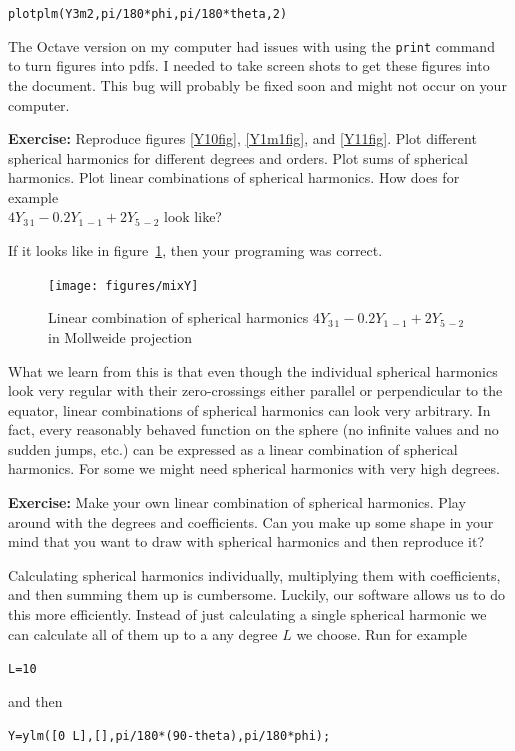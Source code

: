 \documentclass[11pt]{article}
\newcommand{\Yfun}{Y}
\begin{document}
\qquad \verb+plotplm(Y3m2,pi/180*phi,pi/180*theta,2)+

The Octave version on my computer had issues with using the
\verb+print+ command to turn figures into pdfs. I needed to take
screen shots to get these figures into the document. This bug will
probably be fixed soon and might not occur on your computer.

\textbf{Exercise:} Reproduce figures \ref{Y10fig}, \ref{Y1m1fig}, and \ref{Y11fig}. Plot different spherical harmonics for different degrees and orders. Plot sums of spherical harmonics. Plot linear combinations of spherical harmonics. How does for example \\{$4\Yfun_{3\,1} - 0.2\Yfun_{1\,-1} +2\Yfun_{5\,-2}$} look like?

If it looks like in figure~\ref{MixY}, then your programing was
correct.

\begin{figure}%
  \centering
  \texttt{[image: figures/mixY]}
  \caption{Linear combination of spherical harmonics $4\Yfun_{3\,1} - 0.2\Yfun_{1\,-1} +2\Yfun_{5\,-2}$ in Mollweide projection}
  \label{MixY}
\end{figure}

What we learn from this is that even though the individual spherical
harmonics look very regular with their zero-crossings either parallel
or perpendicular to the equator, linear combinations of spherical
harmonics can look very arbitrary. In fact, every reasonably behaved
function on the sphere (no infinite values and no sudden jumps, etc.)
can be expressed as a linear combination of spherical harmonics. For
some we might need spherical harmonics with very high degrees.

\textbf{Exercise:} Make your own linear combination of spherical
harmonics. Play around with the degrees and coefficients. Can you make
up some shape in your mind that you want to draw with spherical
harmonics and then reproduce it?

Calculating spherical harmonics individually, multiplying them with
coefficients, and then summing them up is cumbersome. Luckily, our
software allows us to do this more efficiently. Instead of just
calculating a single spherical harmonic we can calculate all of them
up to a any degree $L$ we choose. Run for example

\quad \verb+L=10+

and then

\quad \verb+Y=ylm([0 L],[],pi/180*(90-theta),pi/180*phi);+
\end{document}
